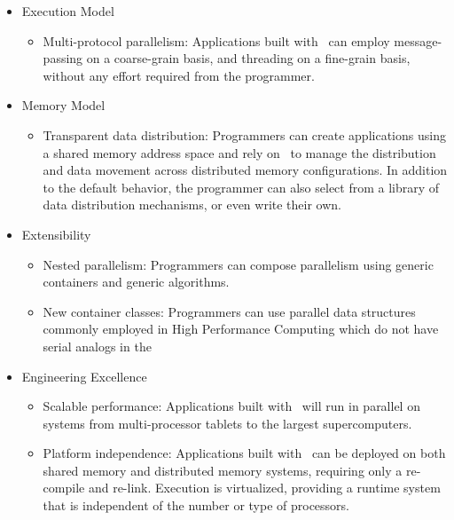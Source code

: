\documentclass{report}
\begin{document}
\begin{itemize}

\item Execution Model
\begin{itemize}
\item Multi-protocol parallelism:
\newline
Applications built with \stapl\ can employ message-passing on a coarse-grain
basis, and threading on a fine-grain basis, without any effort required
from the programmer.
\end{itemize}

\item Memory Model
\begin{itemize}
\item Transparent data distribution:
Programmers can create applications using a shared memory address space and
rely on \stapl\ to manage the distribution and data movement across distributed
memory configurations.  In addition to the default behavior, the programmer
can also select from a library of data distribution mechanisms, or even write
their own.
\newline
\end{itemize}

\item Extensibility
\begin{itemize}
\item Nested parallelism:
\newline
Programmers can compose parallelism using generic containers and generic algorithms.
\item New container classes:
\newline
Programmers can use parallel data structures commonly employed in High Performance Computing which do not have serial analogs in the \stl\
\end{itemize}

\item Engineering Excellence
\begin{itemize}
\item Scalable performance:
\newline
Applications built with \stapl\ will run in parallel on systems from
multi-processor tablets to the largest supercomputers.
\item Platform independence:
\newline
Applications built with \stapl\ can be deployed on both shared memory and distributed memory systems, requiring only a re-compile and re-link.  Execution is virtualized, providing a runtime system that is independent of the number or type of processors.
\end{itemize}

\end{itemize}
\end{document}
